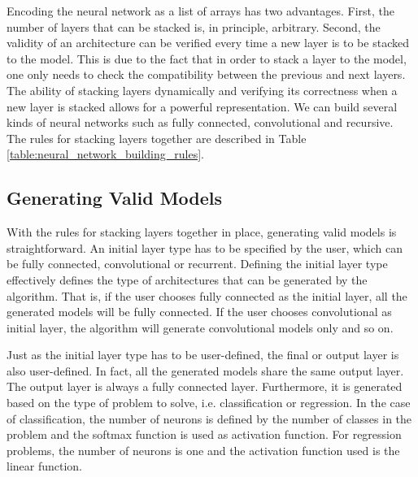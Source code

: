 \documentclass[preprint,12pt]{elsarticle}%
\begin{document}
Encoding the neural network as a list of arrays has two advantages. First, the number of layers that can be stacked is, in principle, arbitrary. Second, the validity of an architecture can be verified every time a new layer is to be stacked to the model. This is due to the fact that in order to stack a layer to the model, one only needs to check the compatibility between the previous and next layers. The ability of stacking layers dynamically and verifying its correctness when a new layer is stacked allows for a powerful representation. We can build several kinds of neural networks such as fully connected, convolutional and recursive. The rules for stacking layers together are described in Table \ref{table:neural_network_building_rules}.

\subsection{Generating Valid Models}
\label{sec:valid_models}

With the rules for stacking layers together in place, generating valid models is straightforward. An initial layer type has to be specified by the user, which can be fully connected, convolutional or recurrent. Defining the initial layer type effectively defines the type of architectures that can be generated by the algorithm. That is, if the user chooses fully connected as the initial layer, all the generated models will be fully connected. If the user chooses convolutional as initial layer, the algorithm will generate convolutional models only and so on.

Just as the initial layer type has to be user-defined, the final or output layer is also user-defined. In fact, all  the generated models share the same output layer. The output layer is always a fully connected layer. Furthermore, it is generated based on the type of problem to solve, i.e. classification or regression. In the case of classification, the number of neurons is defined by the number of classes in the problem and the softmax function is used as activation function. For regression problems, the number of neurons is one and the activation function used is the linear function.
\end{document}

